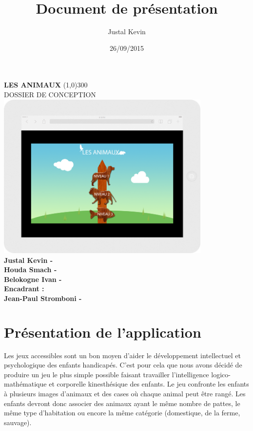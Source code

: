 \documentclass{article}
\title{Document de présentation}
\author{Justal Kevin}
\date{26/09/2015}
\begin{document}
\begin{center}
\textbf{\Huge{LES ANIMAUX}}
\line(1,0){300}\\
DOSSIER DE CONCEPTION\\
\vspace{3cm}
\includegraphics[width=0.8\textwidth]{tablette}\\
\vspace{3cm}
\textbf{Justal Kevin -  \color{black}{- SI5 - IHM}}\\
\textbf{Houda Smach -  \color{black}{- SSTIM }}\\
\textbf{Belokogne Ivan -  \color{black}{- SSTIM }}\\
\vspace{4cm}
\textbf{Encadrant :}\\
\textbf{Jean-Paul Stromboni - }
\end{center}

\newpage
\tableofcontents

\newpage

\section{Présentation de l'application}
\hspace*{0.6cm}Les jeux accessibles sont un bon moyen d'aider le développement intellectuel et psychologique des enfants handicapés. C'est pour cela que nous avons décidé de produire un jeu le plus simple possible faisant travailler l'intelligence logico-mathématique et corporelle kinesthésique des enfants. Le jeu confronte les enfants à plusieurs images d'animaux et des cases où chaque animal peut être rangé. Les enfants devront donc associer des animaux ayant le même nombre de pattes, le même type d'habitation ou encore la même catégorie (domestique, de la ferme, sauvage).
\end{document}
